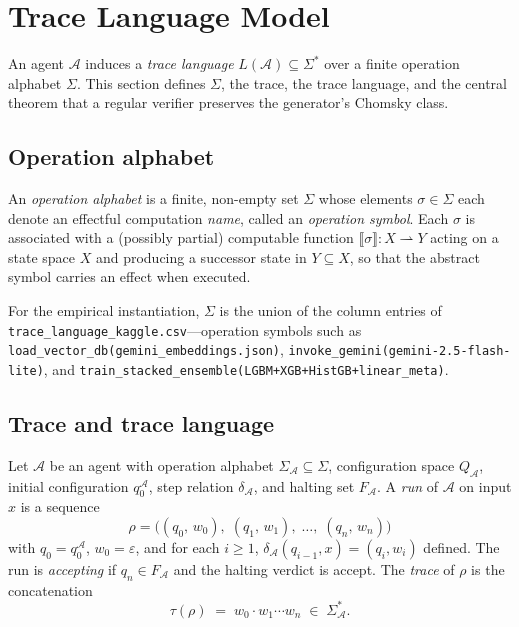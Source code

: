 \section{Trace Language Model}
\label{sec:trace}

An agent $\mathcal{A}$ induces a \emph{trace language}
$L(\mathcal{A}) \subseteq \Sigma^*$ over a finite operation alphabet
$\Sigma$.  This section defines $\Sigma$, the trace, the trace
language, and the central theorem that a regular verifier preserves
the generator's Chomsky class.

\subsection{Operation alphabet}

\begin{definition}
\label{def:opalpha}
An \emph{operation alphabet} is a finite, non-empty set $\Sigma$
whose elements $\sigma\in\Sigma$ each denote an effectful
computation \emph{name}, called an \emph{operation symbol}.
Each $\sigma$ is associated with a (possibly partial) computable
function $\llbracket\sigma\rrbracket : X \rightharpoonup Y$
acting on a state space $X$ and producing a successor state in
$Y\subseteq X$, so that the abstract symbol carries an effect when
executed.
\end{definition}

For the empirical instantiation, $\Sigma$ is the union of the column
entries of \texttt{trace\_language\allowbreak\_kaggle.csv}---operation
symbols such as
\texttt{load\_vector\allowbreak\_db(gemini\_embeddings\allowbreak .json)},
\texttt{invoke\_gemini\allowbreak (gemini-2.5\allowbreak -flash-lite)}, and
\texttt{train\_stacked\allowbreak \_ensemble(LGBM+XGB+HistGB\allowbreak +linear\_meta)}.

\subsection{Trace and trace language}

\begin{definition}[Trace]
\label{def:trace}
Let $\mathcal{A}$ be an agent with operation alphabet
$\Sigma_\mathcal{A} \subseteq \Sigma$, configuration space
$Q_\mathcal{A}$, initial configuration $q_0^\mathcal{A}$, step
relation $\delta_\mathcal{A}$, and halting set $F_\mathcal{A}$.
A \emph{run} of $\mathcal{A}$ on input $x$ is a sequence
\[
\rho = \bigl((q_0,\, w_0),\; (q_1,\, w_1),\; \dots,\; (q_n,\, w_n)\bigr)
\]
with $q_0 = q_0^\mathcal{A}$, $w_0 = \varepsilon$, and for each
$i\ge 1$, $\delta_\mathcal{A}(q_{i-1}, x) = (q_i, w_i)$ defined.
The run is \emph{accepting} if $q_n \in F_\mathcal{A}$ and the
halting verdict is accept.  The \emph{trace} of $\rho$ is the
concatenation
\[
\tau(\rho) \;=\; w_0 \cdot w_1 \cdots w_n \;\in\; \Sigma_\mathcal{A}^*.
\]
\end{definition}

